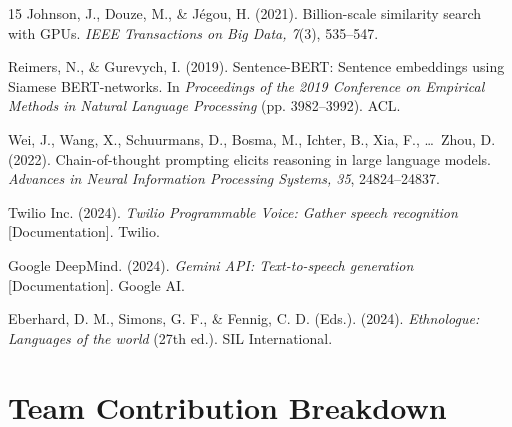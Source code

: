 \documentclass[12pt,a4paper]{report}
\begin{document}
\begin{thebibliography}{15}
Johnson, J., Douze, M., \& J{\'e}gou, H. (2021). Billion-scale similarity search with GPUs. \textit{IEEE Transactions on Big Data, 7}(3), 535--547.

Reimers, N., \& Gurevych, I. (2019). Sentence-BERT: Sentence embeddings using Siamese BERT-networks. In \textit{Proceedings of the 2019 Conference on Empirical Methods in Natural Language Processing} (pp. 3982--3992). ACL.

Wei, J., Wang, X., Schuurmans, D., Bosma, M., Ichter, B., Xia, F., \ldots\ Zhou, D. (2022). Chain-of-thought prompting elicits reasoning in large language models. \textit{Advances in Neural Information Processing Systems, 35}, 24824--24837.

Twilio Inc. (2024). \textit{Twilio Programmable Voice: Gather speech recognition} [Documentation]. Twilio.

Google DeepMind. (2024). \textit{Gemini API: Text-to-speech generation} [Documentation]. Google AI.

Eberhard, D. M., Simons, G. F., \& Fennig, C. D. (Eds.). (2024). \textit{Ethnologue: Languages of the world} (27th ed.). SIL International.

\end{thebibliography}

\appendix

\chapter{Team Contribution Breakdown}
\end{document}
